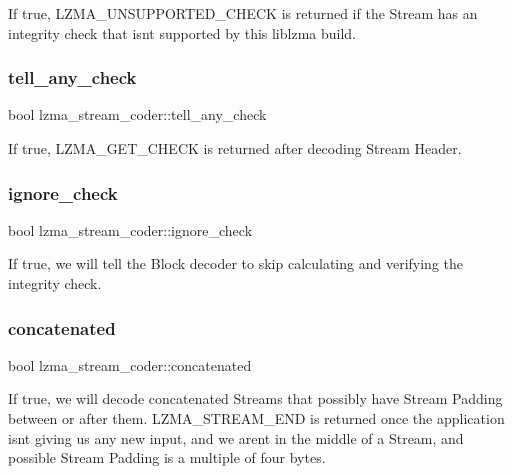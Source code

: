 If true, L\+Z\+M\+A\+\_\+\+U\+N\+S\+U\+P\+P\+O\+R\+T\+E\+D\+\_\+\+C\+H\+E\+CK is returned if the Stream has an integrity check that isn\textquotesingle{}t supported by this liblzma build. \mbox{\label{structlzma__stream__coder_ad928848f065fedef02a5ff62a0c6b0aa}} 
\subsubsection{tell\+\_\+any\+\_\+check}
{\footnotesize\ttfamily bool lzma\+\_\+stream\+\_\+coder\+::tell\+\_\+any\+\_\+check}



If true, L\+Z\+M\+A\+\_\+\+G\+E\+T\+\_\+\+C\+H\+E\+CK is returned after decoding Stream Header. 

\mbox{\label{structlzma__stream__coder_ae58b78f21860b33c949dc8405a961690}} 
\subsubsection{ignore\+\_\+check}
{\footnotesize\ttfamily bool lzma\+\_\+stream\+\_\+coder\+::ignore\+\_\+check}

If true, we will tell the Block decoder to skip calculating and verifying the integrity check. \mbox{\label{structlzma__stream__coder_afc6cd70e510613dd6f82d6b62eaf0690}} 
\subsubsection{concatenated}
{\footnotesize\ttfamily bool lzma\+\_\+stream\+\_\+coder\+::concatenated}

If true, we will decode concatenated Streams that possibly have Stream Padding between or after them. L\+Z\+M\+A\+\_\+\+S\+T\+R\+E\+A\+M\+\_\+\+E\+ND is returned once the application isn\textquotesingle{}t giving us any new input, and we aren\textquotesingle{}t in the middle of a Stream, and possible Stream Padding is a multiple of four bytes. \mbox{\label{structlzma__stream__coder_a97e5ca9cd8c61d2aad2f916e69cf8a3c}} 
